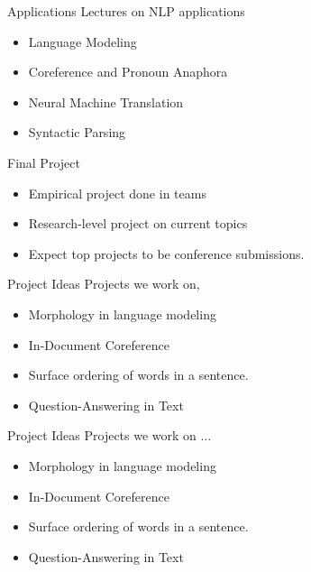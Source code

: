 \documentclass{beamer}
\begin{document}
\begin{frame}{Applications}
  Lectures on NLP applications
  
  \begin{itemize}
  \item Language Modeling
    \air 
  \item Coreference and Pronoun Anaphora
    \air

  \item Neural Machine Translation
    \air 

  \item Syntactic Parsing

  \end{itemize}
\end{frame}


\begin{frame}{Final Project}
  \begin{itemize}
  \item Empirical project done in teams
    \air 

  \item Research-level project on current topics
    \air

  \item Expect top projects to be conference submissions.
  \end{itemize}
\end{frame}

\begin{frame}{Project Ideas}
  Projects we work on,
  \begin{itemize}
  \item Morphology in language modeling
  \item In-Document Coreference
  \item Surface ordering of words in a sentence. 
  \item Question-Answering in Text
  \end{itemize}
\end{frame}


\begin{frame}{Project Ideas}
  Projects we work on $\ldots$
  \begin{itemize}
  \item Morphology in language modeling
  \item In-Document Coreference
  \item Surface ordering of words in a sentence. 
  \item Question-Answering in Text
  \end{itemize}
\end{frame}
\end{document}
